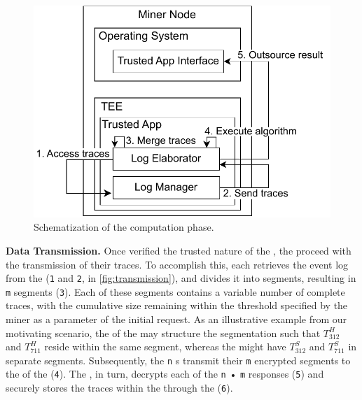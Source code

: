 \begin{figure}
	\vspace{-2em}
	\includegraphics[width=1\textwidth]{content/figures/computationworkflow.pdf}
	\caption[A gull]{Schematization of the computation phase.}
	\vspace{-2pt}
	\label{fig:workflow2}
\end{figure}
\textbf{Data Transmission.} Once verified the trusted nature of the , the  proceed with the transmission of their traces. To accomplish this, each  retrieves the event log from the  (\texttt{1} and \texttt{2}, in \cref{fig:transmission}), and divides it into segments, resulting in \texttt{m} segments (\texttt{3}). Each of these segments contains a variable number of complete traces, with the cumulative size remaining within the threshold specified by the miner as a parameter of the initial request. As an illustrative example from our motivating scenario, the  of the  may structure the segmentation such that $T^H_{312}$ and $T^H_{711}$ reside within the same segment, whereas the  might have $T^S_{312}$ and $T^S_{711}$ in separate segments. Subsequently, the \texttt{n} s transmit their \texttt{m} encrypted segments to the  of the  (\texttt{4}). The , in turn, decrypts each of the \texttt{n} • \texttt{m} responses (\texttt{5}) and securely stores the traces within the  through the  (\texttt{6}).

